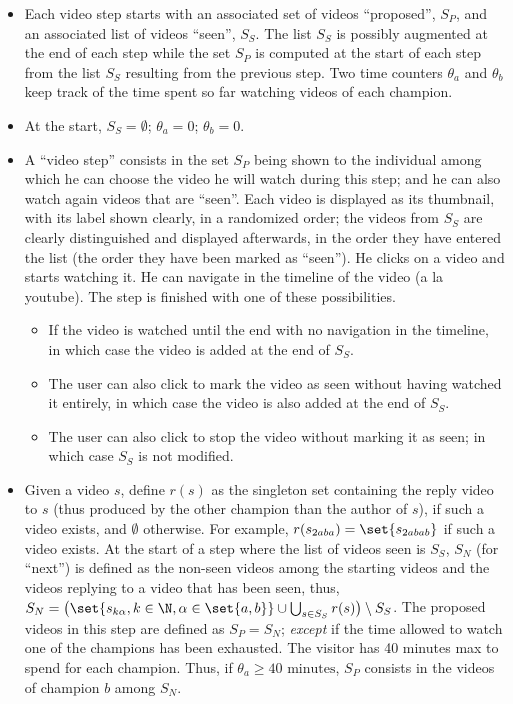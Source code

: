 \documentclass[version=3.21, pagesize, twoside=off, bibliography=totoc, DIV=calc, fontsize=12pt, a4paper]{scrartcl}
\begin{document}
\begin{itemize}
	\item Each video step starts with an associated set of videos “proposed”, $S_P$, and an associated list of videos “seen”, $S_S$. The list $S_S$ is possibly augmented at the end of each step while the set $S_P$ is computed at the start of each step from the list $S_S$ resulting from the previous step. Two time counters $\theta_a$ and $\theta_b$ keep track of the time spent so far watching videos of each champion.
	\item At the start, $S_S = \emptyset$; $\theta_a = 0$; $\theta_b = 0$.
	\item A “video step” consists in the set $S_P$ being shown to the individual among which he can choose the video he will watch during this step; and he can also watch again videos that are “seen”. Each video is displayed as its thumbnail, with its label shown clearly, in a randomized order; the videos from $S_S$ are clearly distinguished and displayed afterwards, in the order they have entered the list (the order they have been marked as “seen”). He clicks on a video and starts watching it. 
He can navigate in the timeline of the video (a la youtube).
The step is finished with one of these possibilities.
	\begin{itemize}
		\item If the video is watched until the end with no navigation in the timeline, in which case the video is added at the end of $S_S$. 
		\item The user can also click to mark the video as seen without having watched it entirely, in which case the video is also added at the end of $S_S$.
		\item The user can also click to stop the video without marking it as seen; in which case $S_S$ is not modified.
	\end{itemize}
	\item Given a video $s$, define $r(s)$ as the singleton set containing the reply video to $s$ (thus produced by the other champion than the author of $s$), if such a video exists, and $\emptyset$ otherwise. For example, $r(s_{2aba}) = \set{s_{2abab}}$ if such a video exists. At the start of a step where the list of videos seen is $S_S$, $S_N$ (for “next”) is defined as the non-seen videos among the starting videos and the videos replying to a video that has been seen, thus, $S_N = \left(\set{s_{k\alpha}, k \in \N, \alpha \in \set{a, b}} \cup \bigcup_{s \in S_S} r(s)\right) \setminus S_S$. The proposed videos in this step are defined as $S_P = S_N$; \emph{except} if the time allowed to watch one of the champions has been exhausted. The visitor has 40 minutes max to spend for each champion. Thus, if $\theta_a ≥ 40 \text{ minutes}$, $S_P$ consists in the videos of champion $b$ among $S_N$.

\end{itemize}
\end{document}
